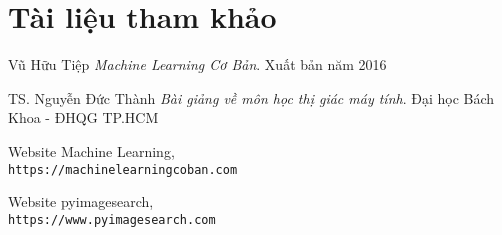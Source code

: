 \section{Tài liệu tham khảo}
\begin{thebibliography}{9}
    Vũ Hữu Tiệp
    \textit{Machine Learning Cơ Bản}. 
    Xuất bản năm 2016

    TS. Nguyễn Đức Thành
    \textit{Bài giảng về môn học thị giác máy tính}. 
    Đại học Bách Khoa - ĐHQG TP.HCM
     
    Website Machine Learning,
    \\\texttt{https://machinelearningcoban.com}

    Website pyimagesearch,
    \\\texttt{https://www.pyimagesearch.com}

\end{thebibliography}